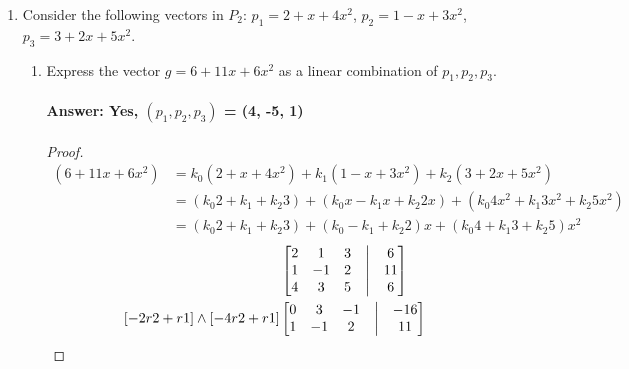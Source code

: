 \documentclass[12pt]{article}
\begin{document}
\begin{enumerate}
        \item Consider the following vectors in $P_2$: $p_1 = 2 + x + 4x^2$, $p_2 = 1 - x + 3x^2$, $p_3 = 3 + 2x + 5x^2$.
              \begin{enumerate}
                      \item Express the vector $g = 6 + 11x + 6x^2$ as a linear combination of $p_1,p_2,p_3$.
                            \paragraph{Answer: Yes, $(p_1,p_2,p_3)$ = (4, -5, 1)}
                            \begin{proof}
                                    \begin{align*}
                                            (6 + 11x + 6x^2) & =  k_{0}(2 + x + 4x^2) +  k_{1}(1 - x + 3x^2) +  k_{2}(3 + 2x + 5x^2)                                \\
                                                             & =  (k_{0}2 + k_{1} + k_{2}3)  +  (k_{0}x - k_{1}x + k_{2}2x)  +  (k_{0}4x^2 + k_{1}3x^2 + k_{2}5x^2) \\
                                                             & =  (k_{0}2 + k_{1} + k_{2}3)  +  (k_{0} - k_{1} + k_{2}2)x    +  (k_{0}4 + k_{1}3 + k_{2}5)x^2
                                    \end{align*}
                                    \begin{align*}
                                             &
                                            \begin{bmatrix}
                                                    2 & 1  & 3 & \bigm| & 6  \\
                                                    1 & -1 & 2 & \bigm| & 11 \\
                                                    4 & 3  & 5 & \bigm| & 6  \\
                                            \end{bmatrix} \\
                                            [-2r2+r1] \wedge [-4r2+r1]
                                             &
                                            \begin{bmatrix}
                                                    0 & 3  & -1 & \bigm| & -16 \\
                                                    1 & -1 & 2  & \bigm| & 11  \\

\end{bmatrix}
\end{align*}
\end{proof}
\end{enumerate}
\end{enumerate}
\end{document}
